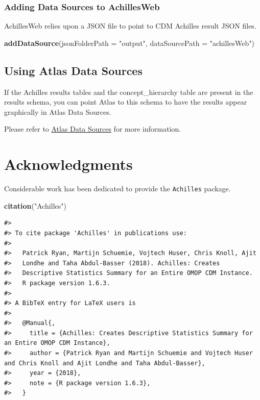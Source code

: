 \documentclass[]{article}
\newenvironment{Shaded}{\begin{snugshade}}{\end{snugshade}}
\newcommand{\KeywordTok}[1]{\textcolor[rgb]{0.13,0.29,0.53}{\textbf{#1}}}
\newcommand{\DataTypeTok}[1]{\textcolor[rgb]{0.13,0.29,0.53}{#1}}
\newcommand{\StringTok}[1]{\textcolor[rgb]{0.31,0.60,0.02}{#1}}
\newcommand{\NormalTok}[1]{#1}
\begin{document}
\subsubsection{Adding Data Sources to
AchillesWeb}\label{adding-data-sources-to-achillesweb}

AchillesWeb relies upon a JSON file to point to CDM Achilles result JSON
files.

\begin{Shaded}
\begin{Highlighting}[]
\KeywordTok{addDataSource}\NormalTok{(}\DataTypeTok{jsonFolderPath =} \StringTok{"output"}\NormalTok{, }
              \DataTypeTok{dataSourcePath =} \StringTok{"achillesWeb"}\NormalTok{)}
\end{Highlighting}
\end{Shaded}

\subsection{Using Atlas Data Sources}\label{using-atlas-data-sources}

If the Achilles results tables and the concept\_hierarchy table are
present in the results schema, you can point Atlas to this schema to
have the results appear graphically in Atlas Data Sources.

Please refer to \href{https://github.com/OHDSI/Atlas}{Atlas Data
Sources} for more information.

\section{Acknowledgments}\label{acknowledgments}

Considerable work has been dedicated to provide the \texttt{Achilles}
package.

\begin{Shaded}
\begin{Highlighting}[]
\KeywordTok{citation}\NormalTok{(}\StringTok{"Achilles"}\NormalTok{)}
\end{Highlighting}
\end{Shaded}

\begin{verbatim}
#> 
#> To cite package 'Achilles' in publications use:
#> 
#>   Patrick Ryan, Martijn Schuemie, Vojtech Huser, Chris Knoll, Ajit
#>   Londhe and Taha Abdul-Basser (2018). Achilles: Creates
#>   Descriptive Statistics Summary for an Entire OMOP CDM Instance.
#>   R package version 1.6.3.
#> 
#> A BibTeX entry for LaTeX users is
#> 
#>   @Manual{,
#>     title = {Achilles: Creates Descriptive Statistics Summary for an Entire OMOP CDM Instance},
#>     author = {Patrick Ryan and Martijn Schuemie and Vojtech Huser and Chris Knoll and Ajit Londhe and Taha Abdul-Basser},
#>     year = {2018},
#>     note = {R package version 1.6.3},
#>   }
\end{verbatim}
\end{document}
